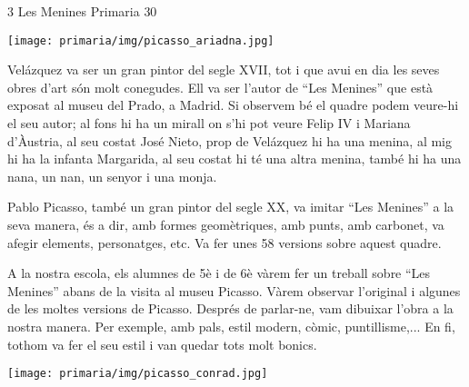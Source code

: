 \begin{news}
{3} %
{Les Menines}
{}
{Primaria}
{30} %

\noindent\texttt{[image: primaria/img/picasso\_ariadna.jpg]}


Velázquez va ser un gran pintor del segle XVII, tot i que avui en dia les seves obres d’art són molt conegudes. Ell
 va ser l’autor de “Les Menines” que està exposat al museu del Prado, a Madrid. Si observem bé el quadre podem veure-hi el seu autor; al fons hi ha un mirall on s’hi pot veure Felip IV i Mariana d’Àustria, al seu costat José Nieto, prop de Velázquez hi ha una menina, al mig hi ha la infanta Margarida, al seu costat hi té una altra menina, també hi ha una nana, un nan, un senyor i una monja. 


Pablo  Picasso, també un gran pintor del segle XX, va imitar  “Les Menines” a la seva
manera, és a dir,  amb formes geomètriques, amb punts, amb carbonet, va afegir elements, personatges, etc. Va fer unes 58 versions sobre aquest quadre. 


A la nostra escola, els alumnes de 5è i de 6è vàrem fer un treball sobre “Les Menines” abans de la visita al museu Picasso.
Vàrem observar l’original i algunes de les moltes versions de Picasso. Després de parlar-ne, vam dibuixar l’obra a la nostra manera. Per exemple, amb pals, estil modern, còmic, puntillisme,...  En fi, tothom  va fer el seu estil i van quedar  tots molt bonics.

\noindent\texttt{[image: primaria/img/picasso\_conrad.jpg]}


\end{news}

\newssep
{}

